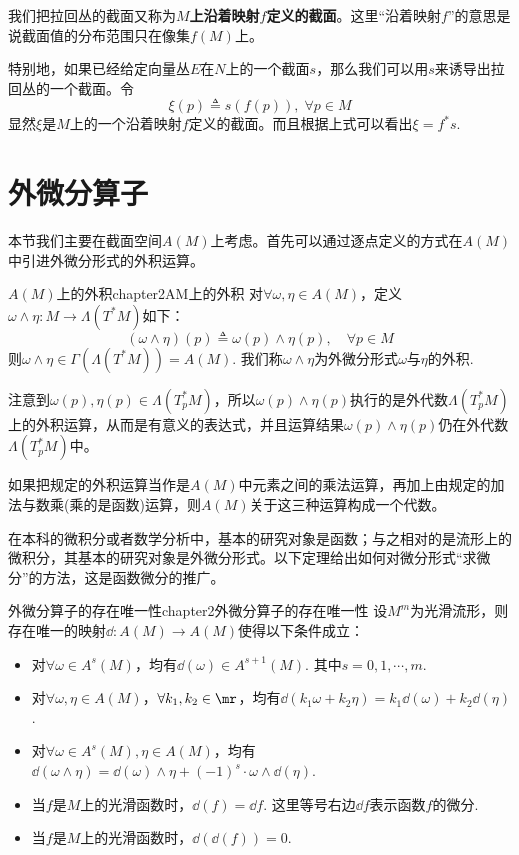 我们把拉回丛的截面又称为\textbf{$M$上沿着映射$f$定义的截面}。这里“沿着映射$f$”的意思是说截面值的分布范围只在像集$f(M)$上。 

特别地，如果已经给定向量丛$E$在$N$上的一个截面$s$，那么我们可以用$s$来诱导出拉回丛的一个截面。令
\[
	\xi(p)\triangleq s(f(p)),\;\forall p\in M
\]
显然$\xi$是$M$上的一个沿着映射$f$定义的截面。而且根据上式可以看出$\xi=f^{\ast}s$. 

\section{外微分算子}

本节我们主要在截面空间$A(M)$上考虑。首先可以通过逐点定义的方式在$A(M)$中引进外微分形式的外积运算。

\begin{mydef}{$A(M)$上的外积}{chapter2AM上的外积}
对$\forall \omega,\eta\in A(M)$，定义$\omega\wedge\eta:M\longrightarrow \Lambda(T^{\ast}M)$如下：
\[
\left( \omega\wedge\eta \right)(p)\triangleq \omega(p)\wedge\eta(p),\quad\forall p\in M
\]
则$\omega\wedge\eta\in \Gamma(\Lambda(T^{\ast}M))=A(M)$. 我们称$\omega\wedge\eta$为外微分形式$\omega$与$\eta$的外积.
\end{mydef}

注意到$\omega(p),\eta(p)\in \Lambda(T^{\ast}_{p}M)$，所以$\omega(p)\wedge\eta(p)$执行的是外代数$\Lambda(T^{\ast}_{p}M)$上的外积运算，从而是有意义的表达式，并且运算结果$\omega(p)\wedge\eta(p)$仍在外代数$\Lambda(T^{\ast}_{p}M)$中。

如果把规定的外积运算当作是$A(M)$中元素之间的乘法运算，再加上由规定的加法与数乘(乘的是函数)运算，则$A(M)$关于这三种运算构成一个代数。

在本科的微积分或者数学分析中，基本的研究对象是函数；与之相对的是流形上的微积分，其基本的研究对象是外微分形式。以下定理给出如何对微分形式“求微分”的方法，这是函数微分的推广。

\begin{mythm}{外微分算子的存在唯一性}{chapter2外微分算子的存在唯一性}
设$M^{m}$为光滑流形，则存在唯一的映射$\dd:A(M)\longrightarrow A(M)$使得以下条件成立：
\begin{itemize}
\item[(1)] 对$\forall \omega\in A^{s}(M)$，均有$\dd(\omega)\in A^{s+1}(M)$. 其中$s=0,1,\cdots,m$.
\item[(2)] 对$\forall \omega,\eta\in A(M)$，$\forall k_{1},k_{2}\in\mr$，均有$\dd (k_{1}\omega+k_{2}\eta)=k_{1}\dd (\omega)+k_{2}\dd(\eta)$.
\item[(3)] 对$\forall \omega\in A^{s}(M),\eta\in A(M)$，均有$\dd(\omega\wedge\eta)=\dd(\omega)\wedge\eta+(-1)^{s}\cdot \omega\wedge\dd(\eta)$.
\item[(4)] 当$f$是$M$上的光滑函数时，$\dd(f)=\dd f$. 这里等号右边$\dd f$表示函数$f$的微分.
\item[(5)] 当$f$是$M$上的光滑函数时，$\dd(\dd(f))=0$. 
\end{itemize}
\end{mythm}

